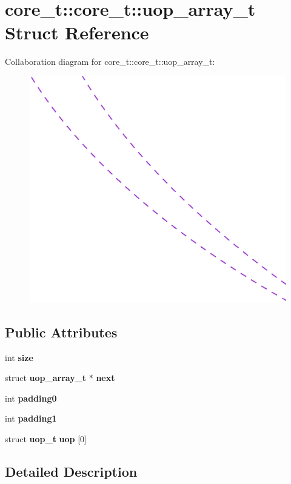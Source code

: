 \section{core\_\-t::core\_\-t::uop\_\-array\_\-t Struct Reference}
\label{structcore__t_1_1uop__array__t}
Collaboration diagram for core\_\-t::core\_\-t::uop\_\-array\_\-t:\nopagebreak
\begin{figure}[H]
\begin{center}
\leavevmode
\includegraphics[width=400pt]{structcore__t_1_1uop__array__t__coll__graph}
\end{center}
\end{figure}
\subsection*{Public Attributes}
\begin{CompactItemize}
\item 
int {\bf size}
\item 
struct {\bf uop\_\-array\_\-t} $\ast$ {\bf next}
\item 
int {\bf padding0}
\item 
int {\bf padding1}
\item 
struct {\bf uop\_\-t} {\bf uop} [0]
\end{CompactItemize}


\subsection{Detailed Description}


